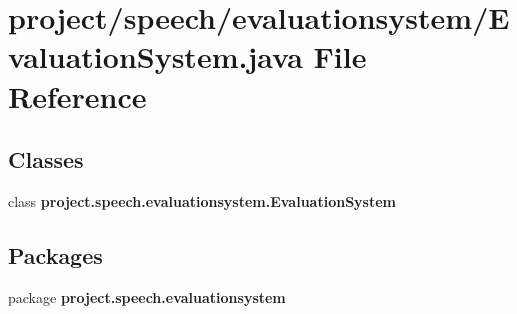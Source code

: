 \section{project/speech/evaluationsystem/\+Evaluation\+System.java File Reference}
\label{_evaluation_system_8java}
\subsection*{Classes}
\begin{DoxyCompactItemize}
\item 
class {\bf project.\+speech.\+evaluationsystem.\+Evaluation\+System}
\end{DoxyCompactItemize}
\subsection*{Packages}
\begin{DoxyCompactItemize}
\item 
package {\bf project.\+speech.\+evaluationsystem}
\end{DoxyCompactItemize}
